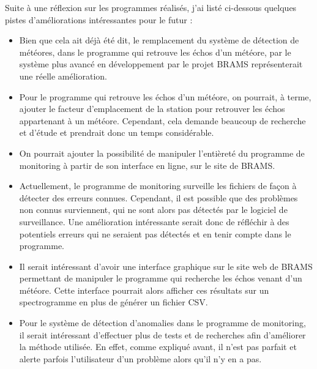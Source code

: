 \documentclass[11pt]{article}
\begin{document}
Suite à une réflexion sur les programmes réalisés, j'ai listé ci-dessous quelques pistes d'améliorations intéressantes pour le futur :
\begin{itemize}
    \item Bien que cela ait déjà été dit, le remplacement du système de détection de météores, dans le programme qui retrouve les échos d'un météore, par le système plus avancé en développement par le projet BRAMS représenterait une réelle amélioration.
    \item Pour le programme qui retrouve les échos d'un météore, on pourrait, à terme, ajouter le facteur d'emplacement de la station pour retrouver les échos appartenant à un météore.
          Cependant, cela demande beaucoup de recherche et d'étude et prendrait donc un temps considérable.
    \item On pourrait ajouter la possibilité de manipuler l'entièreté du programme de monitoring à partir de son interface en ligne, sur le site de BRAMS.
    \item Actuellement, le programme de monitoring surveille les fichiers de façon à détecter des erreurs connues.
          Cependant, il est possible que des problèmes non connus surviennent, qui ne sont alors pas détectés par le logiciel de surveillance.
          Une amélioration intéressante serait donc de réfléchir à des potentiels erreurs qui ne seraient pas détectés et en tenir compte dans le programme.
    \item Il serait intéressant d'avoir une interface graphique sur le site web de BRAMS permettant de manipuler le programme qui recherche les échos venant d'un météore.
          Cette interface pourrait alors afficher ces résultats sur un spectrogramme en plus de générer un fichier CSV.
    \item Pour le système de détection d'anomalies dans le programme de monitoring, il serait intéressant d'effectuer plus de tests et de recherches afin d'améliorer la méthode utilisée.
          En effet, comme expliqué avant, il n'est pas parfait et alerte parfois l'utilisateur d'un problème alors qu'il n'y en a pas.
\end{itemize}



\end{document}
